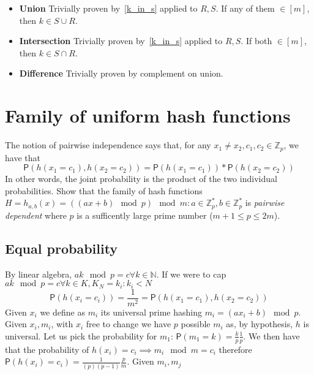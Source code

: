 \documentclass{article}
\newcommand*{\prob}{\mathsf{P}}     %
\begin{document}
\begin{itemize}
    \item \textbf{Union} Trivially proven by~\ref{k_in_s} applied to $R, S$.
    If any of them $\in [m]$, then $k \in S \cup R$.
    \item \textbf{Intersection} Trivially proven by~\ref{k_in_s} applied to $R, S$.
    If both $\in [m]$, then $k \in S \cap R$.
    \item \textbf{Difference} Trivially proven by complement on union.
\end{itemize}


\newpage
\section{Family of uniform hash functions}

The notion of pairwise independence says that, for any $x_{1} \neq x_{2}, c_{1}, c_{2}
\in \mathbb{Z}_{p}$, we have that
    \begin{equation}
    \prob(h(x_{1} = c_{1}), h(x_{2} = c_{2})) = \prob(h(x_{1} = c_{1})) * \prob(h(x_{2} = c_{2}))
    \end{equation}
In other words, the joint probability is the product of the two individual probabilities.
Show that the family of hash functions $H = {h_{a,b}(x) = ((ax + b) \mod p) \mod m}:
a \in \mathbb{Z}^{*}_{p},
b \in \mathbb{Z}^{*}_{p}$ is \emph{pairwise dependent}
where $p$ is a sufficently large prime number ($m + 1 \leq p \leq 2m$).

\subsection{Equal probability}

By linear algebra, $ak \mod p = c \forall k \in \mathbb{N}$.
If we were to cap $ak \mod p = c \forall k \in K, K_{N} = {k_{i}: k_{i} < N}$
\begin{equation}
\prob(h(x_{i} = c_{i})) = \frac{1}{m^{2}} = \prob(h(x_{1} = c_{1}), h(x_{2} = c_{2}))
\end{equation}
Given $x_{i}$ we define as $m_{i}$ its universal prime hashing $m_{i} = (ax_{i} + b) \mod p$.
Given $x_{i}, m_{i}$, with $x_{i}$ free to change we have $p$ possible
$m_{i}$ as, by hypothesis, $h$ is universal.
Let us pick the probability for $m_{1}$: $\prob(m_{1} = k) = \frac{k}{p}\frac{1}{p}$.
We then have that the probability of $h(x_{i}) = c_{i} \implies m_{i} \mod m = c_{i}$
therefore $\prob(h(x_{i}) = c_{i}) = \frac{1}{(p)(p - 1)} \frac{p}{m}$.
Given $m_{i}, m_{j}$
\end{document}
